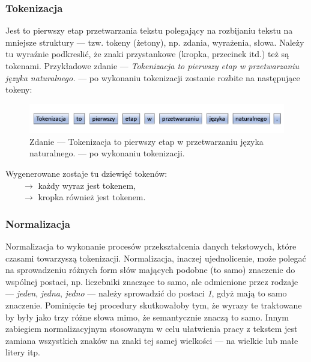 \subsubsection{Tokenizacja}

Jest to pierwszy etap przetwarzania tekstu polegający na rozbijaniu tekstu na mniejsze struktury --- tzw. tokeny (żetony), np. zdania, wyrażenia, słowa.
Należy tu wyraźnie podkreslić, że znaki przystankowe (kropka, przecinek itd.) też są tokenami.
Przykładowe zdanie --- \textit{Tokenizacja to pierwszy etap w przetwarzaniu języka naturalnego.} --- po wykonaniu tokenizacji zostanie rozbite na następujące tokeny:

\begin{figure}[H]
	\centering
	\includegraphics[width=0.95\linewidth]{images/chapter1/tokenizacja.pdf}
	\caption{Zdanie --- Tokenizacja to pierwszy etap w przetwarzaniu języka naturalnego. --- po wykonaniu tokenizacji.}
	\label{fig:tokenizacja}
\end{figure}

\noindent Wygenerowane zostaje tu dziewięć tokenów: \\
$\qquad \rightarrow$ każdy wyraz jest tokenem, \\
$\qquad \rightarrow$  kropka również jest tokenem.


\subsubsection{Normalizacja}
Normalizacja to wykonanie procesów przekształcenia danych tekstowych, które czasami towarzyszą tokenizacji. Normalizacja, inaczej ujednolicenie, może polegać na sprowadzeniu różnych form słów mających podobne (to samo) znaczenie do wspólnej postaci, np. liczebniki znaczące to samo, ale odmienione przez rodzaje --- \textit{jeden}, \textit{jedna}, \textit{jedno} --- należy sprowadzić do postaci \textit{1}, gdyż mają to samo znaczenie. Pominięcie tej procedury skutkowałoby tym, że wyrazy te traktowane by były jako trzy różne słowa mimo, że semantycznie znaczą to samo. Innym zabiegiem normalizacyjnym stosowanym w celu ułatwienia pracy z tekstem jest zamiana wszystkich znaków na znaki tej samej wielkości \cite{normalizacja} --- na wielkie lub małe litery itp. 

